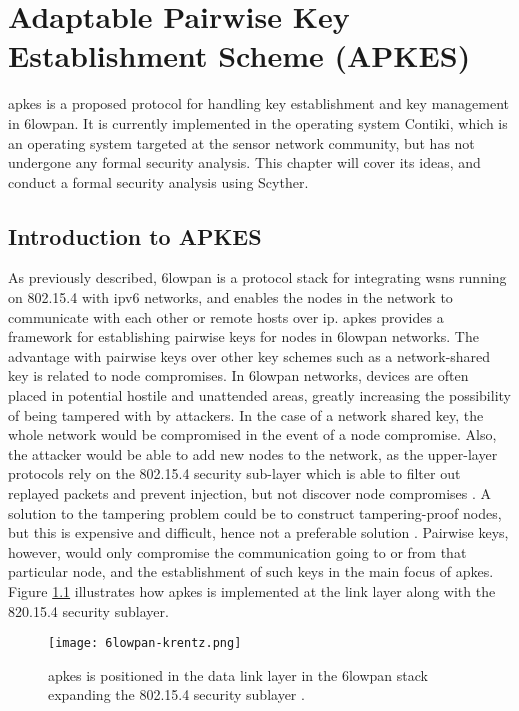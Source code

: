 \chapter{Adaptable Pairwise Key Establishment Scheme (APKES)}
\label{chp:krentz-6lowpan}


\gls{apkes} is a proposed protocol for handling key establishment and key management in \gls{6lowpan}. It is currently implemented in the operating system Contiki, which is an operating system targeted at the sensor network community, but has not undergone any formal security analysis. This chapter will cover its ideas, and conduct a formal security analysis using Scyther. 

\section{Introduction to APKES}

As previously described, \gls{6lowpan} is a protocol stack for integrating \gls{wsn}s running on 802.15.4 with \gls{ip}v6 networks, and enables the nodes in the network to communicate with each other or remote hosts over \gls{ip}. \gls{apkes} provides a framework for establishing pairwise keys for nodes in \gls{6lowpan} networks. The advantage with pairwise keys over other key schemes such as a network-shared key is related to node compromises. In \gls{6lowpan} networks, devices are often placed in potential hostile and unattended areas, greatly increasing the possibility of being tampered with by attackers. In the case of a network shared key, the whole network would be compromised in the event of a node compromise. Also, the attacker would be able to add new nodes to the network, as the upper-layer protocols rely on the 802.15.4 security sub-layer which is able to filter out replayed packets and prevent injection, but not discover node compromises \cite{krentz20136lowpan}. A solution to the tampering problem could be to construct tampering-proof nodes, but this is expensive and difficult, hence not a preferable solution \cite{anderson1996tamper}. Pairwise keys, however, would only compromise the communication going to or from that particular node, and the establishment of such keys in the main focus of \gls{apkes}. Figure \ref{fig:6lowpan-krentz} illustrates how \gls{apkes} is implemented at the link layer along with the 820.15.4 security sublayer.

\begin{figure}
	\centering
	\texttt{[image: 6lowpan-krentz.png]}
	\caption{\gls{apkes} is positioned in the data link layer in the \gls{6lowpan} stack expanding the 802.15.4 security sublayer \cite{krentz20136lowpan}.}
	\label{fig:6lowpan-krentz}
\end{figure}

